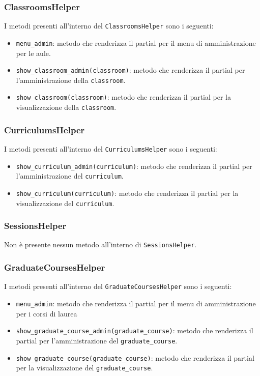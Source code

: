 \documentclass[11pt,a4paper]{article}
\begin{document}
\subsubsection{ClassroomsHelper}
I metodi presenti all'interno del \verb|ClassroomsHelper| sono i seguenti:
\begin{itemize}
 \item \verb|menu_admin|: metodo che renderizza il partial per il menu di amministrazione per le aule.
 \item \verb|show_classroom_admin(classroom)|: metodo che renderizza il partial per l'amministrazione della \verb|classroom|.
\item \verb|show_classroom(classroom)|: metodo che renderizza il partial per la visualizzazione della \verb|classroom|.
\end{itemize}
\subsubsection{CurriculumsHelper}
I metodi presenti all'interno del \verb|CurriculumsHelper| sono i seguenti:
\begin{itemize}
\item \verb|show_curriculum_admin(curriculum)|: metodo che renderizza il partial per l'amministrazione del \verb|curriculum|.
\item \verb|show_curriculum(curriculum)|: metodo che renderizza il partial per la visualizzazione del \verb|curriculum|.
\end{itemize}
\subsubsection{SessionsHelper}
Non è presente nessun metodo all'interno di \verb|SessionsHelper|.
\subsubsection{GraduateCoursesHelper}
I metodi presenti all'interno del \verb|GraduateCoursesHelper| sono i seguenti:
\begin{itemize}
 \item \verb|menu_admin|: metodo che renderizza il partial per il menu di amministrazione per i corsi di laurea
 \item \verb|show_graduate_course_admin(graduate_course)|: metodo che renderizza il partial per l'amministrazione del  \verb|graduate_course|.
\item \verb|show_graduate_course(graduate_course)|: metodo che renderizza il partial per la visualizzazione del \verb|graduate_course|.
\end{itemize}
\end{document}
